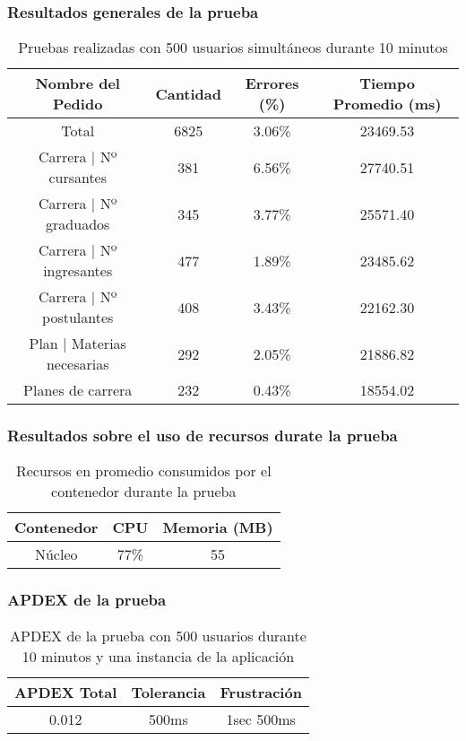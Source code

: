 \subsubsection{Resultados generales de la prueba}
\begin{table}[!htbp]
    \centering
    \makegapedcells
    \begin{tabular}{|c|c|c|c|}
    \hline
    Nombre del Pedido & Cantidad & Errores (\%) & Tiempo Promedio (ms) \\ \hline
    Total & 6825 & 3.06\% & 23469.53 \\ \hline
    Carrera | Nº cursantes & 381 & 6.56\% & 27740.51\\ \hline
    Carrera | Nº graduados & 345 & 3.77\% & 25571.40\\ \hline
    Carrera | Nº ingresantes & 477 & 1.89\% & 23485.62\\ \hline
    Carrera | Nº postulantes & 408 & 3.43\% & 22162.30\\ \hline
    Plan | Materias necesarias & 292 & 2.05\% & 21886.82\\ \hline
    Planes de carrera & 232 & 0.43\% & 18554.02\\ \hline

    \end{tabular}
    \caption{Pruebas realizadas con 500 usuarios simultáneos durante 10 minutos}
    \label{tab:tabla_planes}
\end{table}


\subsubsection{Resultados sobre el uso de recursos durate la prueba}
\begin{table}[!htbp]
    \centering
    \makegapedcells
    \begin{tabular}{|c|c|c}
    \hline
    Contenedor & CPU & Memoria (MB)\\ \hline
    Núcleo & 77\% & 55 \\ \hline
    \end{tabular}
    \caption{Recursos en promedio consumidos por el contenedor durante la prueba}
    \label{tab:tabla_planes}
\end{table}

\subsubsection{APDEX de la prueba}
\begin{table}[!htbp]
    \centering
    \makegapedcells
    \begin{tabular}{|c|c|c}
    \hline
    APDEX Total & Tolerancia & Frustración\\ \hline
    0.012 & 500ms & 1sec 500ms \\ \hline
    \end{tabular}
    \caption{APDEX de la prueba con 500 usuarios durante 10 minutos y una instancia de la aplicación}
    \label{tab:tabla_planes}
\end{table}


